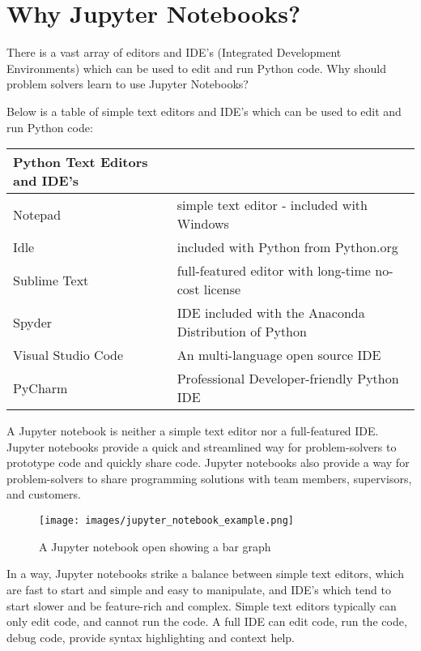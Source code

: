 \documentclass{book}
\makeatletter
\def\maxwidth{\ifdim\Gin@nat@width>\linewidth\linewidth
\else\Gin@nat@width\fi}
\let\Oldincludegraphics\includegraphics
\renewcommand{\includegraphics}[1]{\Oldincludegraphics[width=.8\maxwidth]{#1}}
\makeatother
\begin{document}
    
        \hypertarget{why-jupyter-notebooks}{%
\section{Why Jupyter Notebooks?}\label{why-jupyter-notebooks}}
    




    
        There is a vast array of editors and IDE's (Integrated Development
Environments) which can be used to edit and run Python code. Why should
problem solvers learn to use Jupyter Notebooks?

Below is a table of simple text editors and IDE's which can be used to
edit and run Python code:

\begin{longtable}[]{@{}ll@{}}
\toprule
Python Text Editors and IDE's &\tabularnewline
\midrule
\endhead
Notepad & simple text editor - included with Windows\tabularnewline
Idle & included with Python from Python.org\tabularnewline
Sublime Text & full-featured editor with long-time no-cost
license\tabularnewline
Spyder & IDE included with the Anaconda Distribution of
Python\tabularnewline
Visual Studio Code & An multi-language open source IDE\tabularnewline
PyCharm & Professional Developer-friendly Python IDE\tabularnewline
\bottomrule
\end{longtable}

A Jupyter notebook is neither a simple text editor nor a full-featured
IDE. Jupyter notebooks provide a quick and streamlined way for
problem-solvers to prototype code and quickly share code. Jupyter
notebooks also provide a way for problem-solvers to share programming
solutions with team members, supervisors, and customers.

\begin{figure}
\centering
\texttt{[image: images/jupyter\_notebook\_example.png]}
\caption{A Jupyter notebook open showing a bar graph}
\end{figure}

In a way, Jupyter notebooks strike a balance between simple text
editors, which are fast to start and simple and easy to manipulate, and
IDE's which tend to start slower and be feature-rich and complex. Simple
text editors typically can only edit code, and cannot run the code. A
full IDE can edit code, run the code, debug code, provide syntax
highlighting and context help.
    
\end{document}
